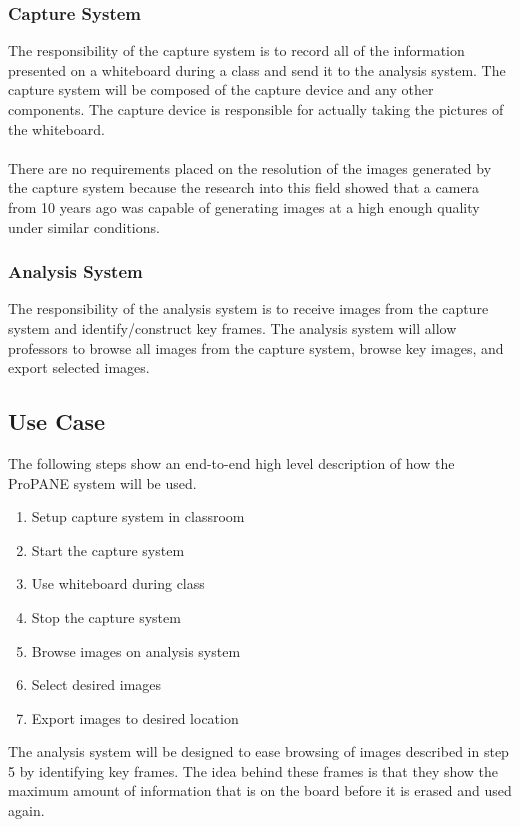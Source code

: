 \documentclass[]{article}
\begin{document}
			\subsubsection{Capture System}
				The responsibility of the capture system is to record all of the information presented on a whiteboard during a class and send it to the analysis system. The capture system will be composed of the capture device and any other components. The capture device is responsible for actually taking the pictures of the whiteboard.\\
				\\
				There are no requirements placed on the resolution of the images generated by the capture system because the research into this field showed that a camera from 10 years ago was capable of generating images at a high enough quality under similar conditions. 
				
			\subsubsection{Analysis System}
				The responsibility of the analysis system is to receive images from the capture system and identify/construct key frames. The analysis system will allow professors to browse all images from the capture system, browse key images, and export selected images. 
			
		\subsection{Use Case}
			The following steps show an end-to-end high level description of how the ProPANE system will be used.
			\begin{enumerate}
				\item Setup capture system in classroom
				\item Start the capture system
				\item Use whiteboard during class
				\item Stop the capture system 
				\item Browse images on analysis system
				\item Select desired images
				\item Export images to desired location
			\end{enumerate}			
			The analysis system will be designed to ease browsing of images described in step 5 by identifying key frames. The idea behind these frames is that they show the maximum amount of information that is on the board before it is erased and used again. 
	
\end{document}
